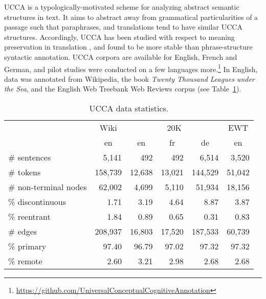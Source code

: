 \documentclass[12pt,a4paper,table]{report}
\begin{document}
UCCA is a typologically-motivated scheme for analyzing abstract semantic structures in text. It aims to abstract away from grammatical particularities of a passage 
such that paraphrases, and translations tend to have similar UCCA structures.
Accordingly, UCCA has been studied with respect to meaning preservation in translation \citep{sulem2015conceptual},
and found to be more stable than phrase-structure syntactic annotation.
UCCA corpora are available for English, French and German, and pilot studies were conducted on a few languages more.\footnote{\scriptsize\url{https://github.com/UniversalConceptualCognitiveAnnotation}}
In English, data was annotated from Wikipedia, the book \textit{Twenty Thousand Leagues under the Sea}, and the English Web Treebank Web Reviews corpus (see Table~\ref{tab:data_english}).

\begin{table}
\centering
\begin{tabular}{l|r|rrr|r}
    & \multicolumn{1}{c|}{Wiki} & \multicolumn{3}{c|}{20K} & \multicolumn{1}{c}{EWT} \\
    & \multicolumn{1}{c|}{en} & \multicolumn{1}{c}{en} & \multicolumn{1}{c}{fr} & \multicolumn{1}{c|}{de} & \multicolumn{1}{c}{en} \\
    \hline
    \# sentences&5,141&492&492&6,514&3,520 \\
    \# tokens&158,739&12,638&13,021&144,529&51,042 \\
    \hline
    \# { non-terminal nodes}&62,002&4,699&5,110&51,934&18,156 \\
    \% {discontinuous}&1.71&3.19&4.64&8.87&3.87 \\
    \% {reentrant}&1.84&0.89&0.65&0.31&0.83 \\
    \hline
    \# edges&208,937&16,803&17,520&187,533&60,739 \\
    \% primary&97.40&96.79&97.02&97.32&97.32 \\
    \% remote&2.60&3.21&2.98&2.68&2.68
\end{tabular}
\caption{UCCA data statistics.}\label{tab:data_english}
\end{table}
\end{document}
